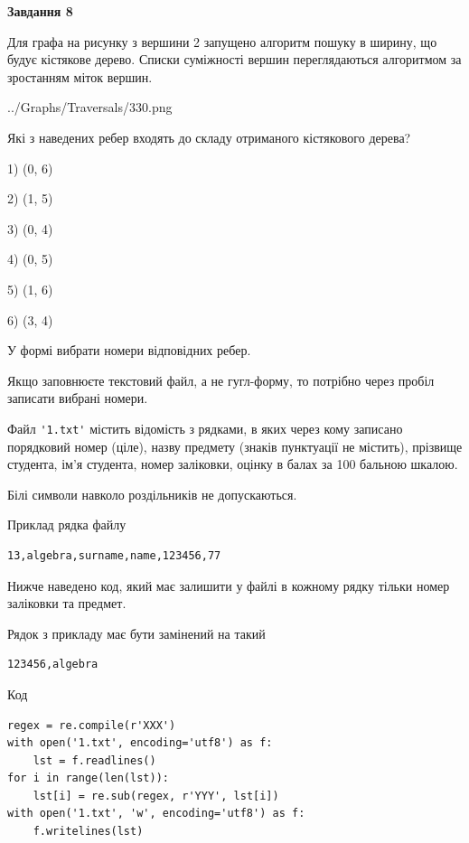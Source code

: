 \documentclass[12pt, ukrainian]{article}
\def\code#1{\Verb!#1!}
\begin{document}
{\begin {large}
{\begin {center}\textbf{Завдання 8}\end {center}}\par
Для графа на рисунку з вершини 2 запущено алгоритм пошуку в ширину, що будує кістякове дерево. Списки суміжності вершин переглядаються алгоритмом за зростанням міток вершин.\par
\begin{center}
	{../Graphs/Traversals/330.png}
\end{center}
\par Які з наведених ребер входять до складу отриманого кістякового дерева?\par
1) (0, 6)\par
2) (1, 5)\par
3) (0, 4)\par
4) (0, 5)\par
5) (1, 6)\par
6) (3, 4)\par
{\vskip 15pt} У формі вибрати номери відповідних ребер.


Якщо заповнюєте текстовий файл, а не гугл-форму, то потрібно через пробіл записа\-ти вибрані номери.\par
\newpage


Файл \code{'1.txt'} містить відомість з рядками, в яких через кому записано поряд\-ковий номер (ціле), назву предмету (знаків пунктуації не містить), прізвище студента, ім'я студента, номер заліковки, оцінку в балах за 100 бальною шкалою.

Білі символи навколо роздільників не допускаються.

Приклад рядка файлу



\begin{verbatim}
13,algebra,surname,name,123456,77
\end{verbatim}


Нижче наведено код, який має залишити у файлі в кожному рядку тільки номер заліковки та предмет.

Рядок з прикладу має бути замінений на такий



\begin{verbatim}
123456,algebra
\end{verbatim}




Код



\begin{verbatim}
regex = re.compile(r'XXX')
with open('1.txt', encoding='utf8') as f:
    lst = f.readlines()
for i in range(len(lst)):
    lst[i] = re.sub(regex, r'YYY', lst[i])
with open('1.txt', 'w', encoding='utf8') as f:
    f.writelines(lst)
\end{verbatim}







\end{large}}
\end{document}
